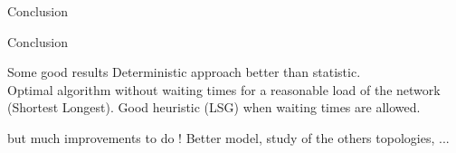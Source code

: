 \documentclass[10 pt]{beamer}
\begin{document}
\begin{section}{Conclusion}
 

\begin{frame}{Conclusion}

 \begin{block}{Some good results}
  Deterministic approach better than statistic.\\
    Optimal algorithm without waiting times for a reasonable load of the network (Shortest Longest). Good heuristic (LSG) when waiting times are allowed.
 \end{block}
 
  \begin{block}{but much improvements to do !}
    Better model, study of the others topologies, ...
 \end{block}

\end{frame}

\end{section}
\end{document}
